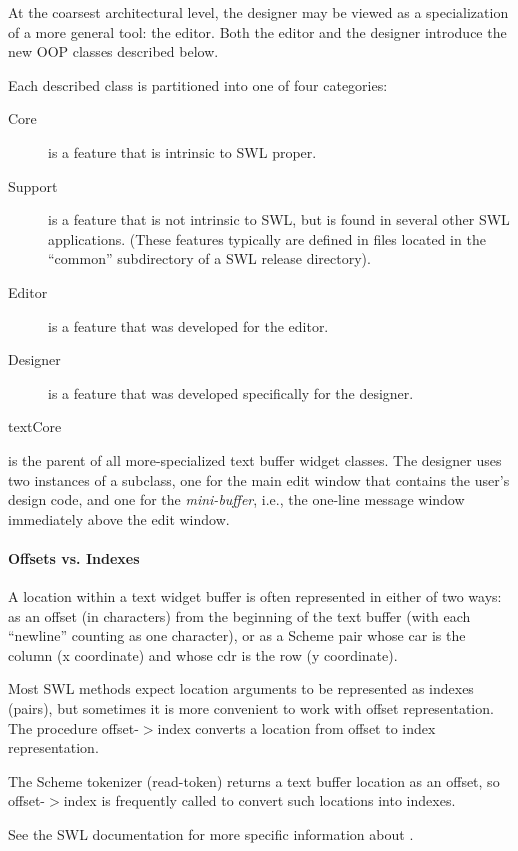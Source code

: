 \documentclass{article}
\begin{document}
At the coarsest architectural level, the designer may be viewed as a
specialization of a more general tool: the editor.  Both the editor
and the designer introduce the new OOP classes described below.

Each described class is partitioned into one of four categories:

\begin{description}

\item[Core]	is a feature that is intrinsic to {\sc SWL} proper.

\item[Support] is a feature that is not intrinsic to {\sc SWL}, but is found in
	  several other {\sc SWL} applications.  (These features typically
	  are defined in files located in the ``common'' subdirectory of a {\sc SWL} 
	  release directory).

\item[Editor]  is a feature that was developed for the editor.

\item[Designer] is a feature that was developed specifically for the
	  designer.

\end{description}




\begin{class}{text}{}{Core}

 is the parent of all more-specialized text buffer widget
classes.  The designer uses two instances of a  subclass, one
for the main edit window that contains the user's design code, and one
for the {\em mini-buffer}, i.e., the one-line message window immediately
above the edit window.


\paragraph{Offsets vs. Indexes}

A location within a text widget buffer is often represented in either
of two ways: as an offset (in characters) from the beginning of the
text buffer (with each ``newline'' counting as one character), or as a
Scheme pair whose {\sf car} is the column (x coordinate) and whose
{\sf cdr} is the row (y coordinate).

Most {\sc SWL} methods expect location arguments to be represented as
indexes (pairs), but sometimes it is more convenient to work with
offset representation.  The procedure {\sf offset-$>$index} converts a
location from offset to index representation.

The Scheme tokenizer ({\sf read-token}) returns a text buffer location
as an offset, so {\sf offset-$>$index} is frequently called to convert
such locations into indexes.

See the {\sc SWL} documentation for more specific information about
.
\end{class}
\end{document}
